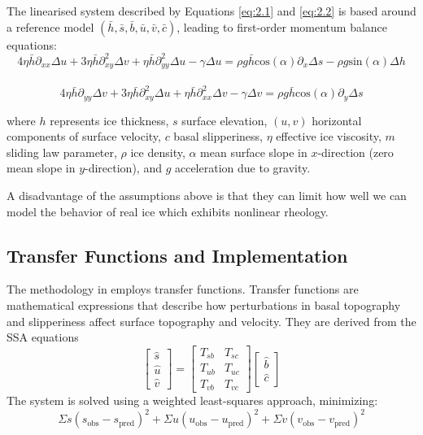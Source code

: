 The linearised system described by Equations \ref{eq:2.1} and \ref{eq:2.2} is based around a reference model $(\bar{h}, \bar{s}, \bar{b}, \bar{u}, \bar{v}, \bar{c})$, leading to first-order momentum balance equations:
\begin{equation}
4 \eta \bar{h} \partial_{xx} \Delta u + 3 \eta \bar{h} \partial_{xy}^{2} \Delta v + \eta \bar{h} \partial_{yy}^{2}\Delta u -\gamma \Delta u  = \rho g \bar{h}\mathrm{cos}(\alpha) \partial_x \Delta s - \rho g \mathrm{sin}(\alpha)\Delta h
\end{equation}\\
\begin{equation}
4 \eta \bar{h} \partial_{yy} \Delta v + 3 \eta \bar{h} \partial_{xy}^{2} \Delta u + \eta \bar{h} \partial_{xx}^{2}\Delta v -\gamma \Delta v  = \rho g \bar{h}\mathrm{cos}(\alpha) \partial_y \Delta s
\end{equation}

where $h$ represents ice thickness, $s$ surface elevation, $(u, v)$ horizontal components of surface velocity, $c$ basal slipperiness, $\eta$ effective ice viscosity, $m$ sliding law parameter, $\rho$ ice density, $\alpha$ mean surface slope in $x$-direction (zero mean slope in $y$-direction), and $g$ acceleration due to gravity.

A disadvantage of the  assumptions above is that they can limit how well we can model the behavior of real ice which exhibits nonlinear rheology.

\subsection*{Transfer Functions and Implementation}

The methodology in \cite{Ockenden_2022} employs transfer functions. Transfer functions are mathematical expressions that describe how perturbations in basal topography and slipperiness affect surface topography and velocity. They are derived from the SSA equations
$$\begin{bmatrix}
\hat{s} \\
\hat{u} \\
\hat{v}
\end{bmatrix} =\begin{bmatrix}
T_{sb} & T_{sc} \\
T_{ub} & T_{uc} \\
T_{vb} & T_{vc}
\end{bmatrix}
\begin{bmatrix}
\hat{b}\\
\hat{c}
\end{bmatrix}$$
The system is solved using a weighted least-squares approach, minimizing:
\begin{equation}
\Sigma s(s_{\mathrm{obs}} - s_{\mathrm{pred}})^2 + \Sigma u(u_{\mathrm{obs}} - u_{\mathrm{pred}})^2 + \Sigma v(v_{\mathrm{obs}} - v_{\mathrm{pred}})^2
\end{equation}

